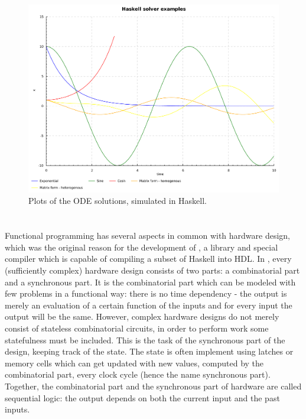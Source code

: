 \begin{figure}[h!]
	\centering
	\includegraphics[width=\textwidth]{../haskell/haskell.pdf}
	\caption{Plots of the ODE solutions, simulated in Haskell.}
	\label{f:solver_example}
\end{figure}


\section{\clash{}}
\label{s:clash}
Functional programming has several aspects in common with hardware design, which was the original reason for the development of \clash{}, a library and special compiler which is capable of compiling a subset of Haskell into HDL. In \clash{}, every (sufficiently complex) hardware design consists of two parts: a combinatorial part and a synchronous part. It is the combinatorial part which can be modeled with few problems in a functional way: there is no time dependency - the output is merely an evaluation of a certain function of the inputs and for every input the output will be the same. However, complex hardware designs do not merely consist of stateless combinatorial circuits, in order to perform work some statefulness must be included. This is the task of the synchronous part of the design, keeping track of the state. The state is often implement using latches or memory cells which can get updated with new values, computed by the combinatorial part, every clock cycle (hence the name synchronous part). Together, the combinatorial part and the synchronous part of hardware are called sequential logic: the output depends on both the current input and the past inputs.

